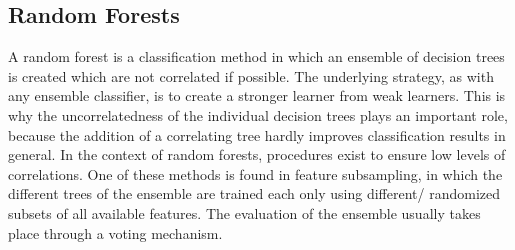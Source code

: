 \subsection{Random Forests}

A random forest is a classification method in which an ensemble of decision trees is created which are not correlated if possible. The underlying strategy, as with any ensemble classifier, is to create a stronger learner from weak learners. This is why the uncorrelatedness of the individual decision trees plays an important role, because the addition of a correlating tree hardly improves classification results in general. In the context of random forests, procedures exist to ensure low levels of correlations. One of these methods is found in feature subsampling, in which the different trees of the ensemble are trained each only using different/ randomized subsets of all available features. The evaluation of the ensemble usually takes place through a voting mechanism. \cite{Jiang}

